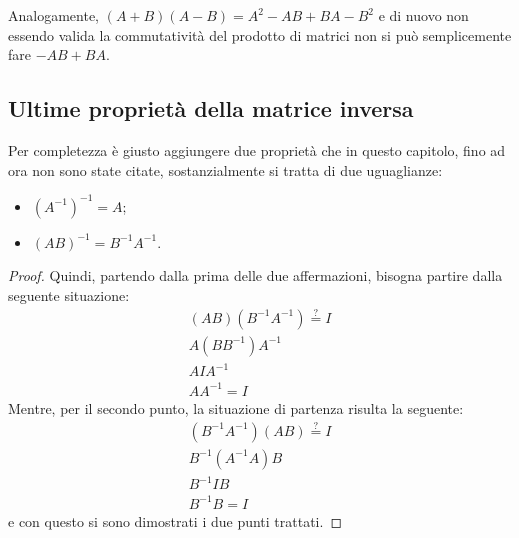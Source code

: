 Analogamente, $(A+B)(A-B)=A^2-AB+BA-B^2$ e di nuovo non essendo valida la commutatività del prodotto di
matrici non si può semplicemente fare $-AB+BA$.

\subsection{Ultime proprietà della matrice inversa}
\label{sec:propmatinv}
Per completezza è giusto aggiungere due proprietà che in questo capitolo, fino ad ora non sono state
citate, sostanzialmente si tratta di due uguaglianze:
\begin{itemize}
\item $(A^{-1})^{-1}=A$;
\item $(AB)^{-1}=B^{-1}A^{-1}$.
\end{itemize}
\begin{proof}
  Quindi, partendo dalla prima delle due affermazioni, bisogna partire dalla seguente situazione:
  \begin{eqnarray*}
    (AB)(B^{-1}A^{-1})\overset{?}{=}I\\
    A(BB^{-1})A^{-1}\\
    AIA^{-1}\\
    AA^{-1}=I
  \end{eqnarray*}
  Mentre, per il secondo punto, la situazione di partenza risulta la seguente:
  \begin{eqnarray*}
    (B^{-1}A^{-1})(AB)\overset{?}{=}I\\
    B^{-1}(A^{-1}A)B\\
    B^{-1}IB\\
    B^{-1}B=I
  \end{eqnarray*}
  e con questo si sono dimostrati i due punti trattati.
\end{proof}
